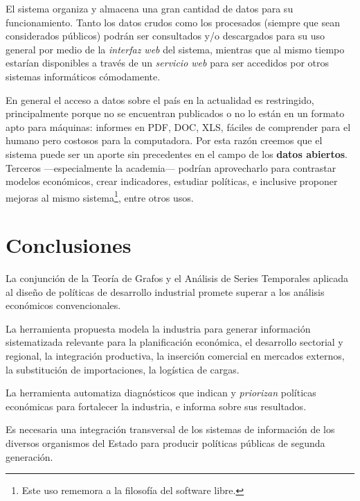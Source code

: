 \documentclass[a4paper]{report}
\begin{document}
El sistema organiza y almacena una gran cantidad de datos para su funcionamiento. Tanto los datos crudos como los procesados (siempre que sean considerados públicos) podrán ser consultados y/o descargados para su uso general por medio de la \textit{interfaz web} del sistema, mientras que al mismo tiempo estarían disponibles a través de un \textit{servicio web} para ser accedidos por otros sistemas informáticos cómodamente.

En general el acceso a datos sobre el país en la actualidad es restringido, principalmente porque no se encuentran publicados o no lo están en un formato apto para máquinas: informes en \textsc{PDF}, \textsc{DOC}, \textsc{XLS}, fáciles de comprender para el humano pero costosos para la computadora. Por esta razón creemos que el sistema puede ser un aporte sin precedentes en el campo de los \textbf{datos abiertos}. Terceros —especialmente la academia— podrían aprovecharlo para contrastar modelos económicos, crear indicadores, estudiar políticas, e inclusive proponer mejoras al mismo sistema\footnote{Este uso rememora a la filosofía del software libre.}, entre otros usos.

\section*{Conclusiones}


La conjunción de la Teoría de Grafos y el Análisis de Series Temporales aplicada al diseño de políticas de desarrollo industrial promete superar a los análisis económicos convencionales.

La herramienta propuesta modela la industria para generar información sistematizada relevante para la planificación económica, el desarrollo sectorial y regional, la integración productiva, la inserción comercial en mercados externos, la substitución de importaciones, la logística de cargas.

La herramienta automatiza diagnósticos que indican y \textit{priorizan} políticas económicas para fortalecer la industria, e informa sobre sus resultados.

Es necesaria una integración transversal de los sistemas de información de los diversos organismos del Estado para producir políticas públicas de segunda generación.
\end{document}
